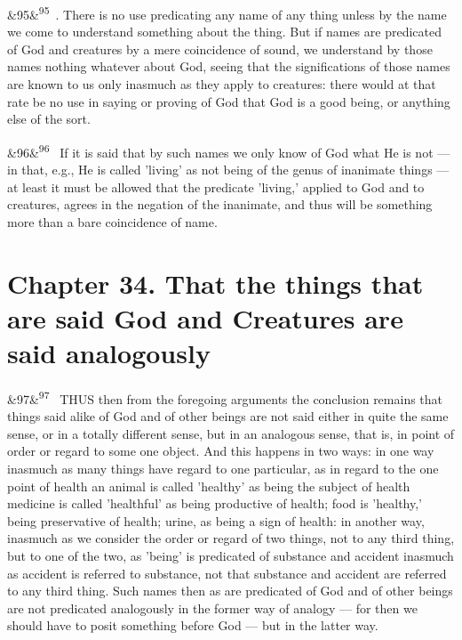 \documentclass[12pt]{article}
\newcommand{\para}[1][]{\par\noindent\ifx&#1&\else\textsuperscript{\footnotesize #1}~\fi}
\begin{document}
\para[95] 5. There is no use predicating any name of any thing unless by the name we come to understand something about the thing. But if names are predicated of God and creatures by a mere coincidence of sound, we understand by those names nothing whatever about God, seeing that the significations of those names are known to us only inasmuch as they apply to creatures: there would at that rate be no use in saying or proving of God that God is a good being, or anything else of the sort.

\para[96] If it is said that by such names we only know of God what He is not --- in that, e.g., He is called 'living' as not being of the genus of inanimate things --- at least it must be allowed that the predicate 'living,' applied to God and to creatures, agrees in the negation of the inanimate, and thus will be something more than a bare coincidence of name.

\section*{Chapter 34. That the things that are said God and Creatures are said analogously}

\para[97] THUS then from the foregoing arguments the conclusion remains that things said alike of God and of other beings are not said either in quite the same sense, or in a totally different sense, but in an analogous sense, that is, in point of order or regard to some one object. And this happens in two ways: in one way inasmuch as many things have regard to one particular, as in regard to the one point of health an animal is called 'healthy' as being the subject of health medicine is called 'healthful' as being productive of health; food is 'healthy,' being preservative of health; urine, as being a sign of health: in another way, inasmuch as we consider the order or regard of two things, not to any third thing, but to one of the two, as 'being' is predicated of substance and accident inasmuch as accident is referred to substance, not that substance and accident are referred to any third thing. Such names then as are predicated of God and of other beings are not predicated analogously in the former way of analogy --- for then we should have to posit something before God --- but in the latter way.
\end{document}
